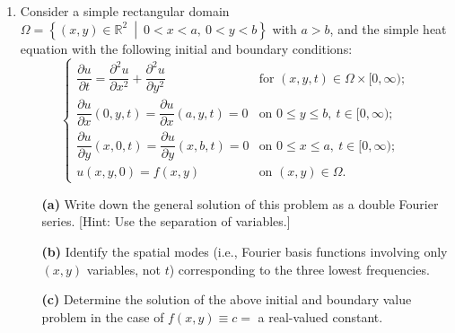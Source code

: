 \documentclass[10pt,letterpaper]{report}
\newcommand{\R}{\mathbb{R}}
\newcommand{\sett}[2]{\left\{{#1} \ \middle| \ {#2}\right\}}
\begin{document}
\begin{enumerate}
\item \begin{qbox}
Consider a simple rectangular domain $\Omega = \sett{(x, y) \in \R^2}{0 < x< a,\ 0 < y < b}$ with $a > b$, and the simple heat equation with the following initial and boundary conditions:
\[
\begin{cases}
\dfrac{\partial u}{\partial t} = \dfrac{\partial^2 u}{\partial x^2} + \dfrac{\partial^2 u}{\partial y^2} &\textrm{for } (x, y, t) \in \Omega \times [0, \infty);
\\
\dfrac{\partial u}{\partial x}(0, y, t) = \dfrac{\partial u}{\partial x}(a, y, t) = 0  &\textrm{on } 0 \leq y \leq b,\ t\in [0, \infty);
\\
\dfrac{\partial u}{\partial y}(x, 0, t) = \dfrac{\partial u}{\partial y}(x, b, t) = 0  &\textrm{on } 0 \leq x \leq a,\ t\in [0, \infty);
\\
u(x, y, 0) = f(x, y) &\textrm{on }(x, y) \in \Omega.
\end{cases}
\]
\begin{itemize}
    \item[\textbf{(a)}] Write down the general solution of this problem as a double Fourier series. [Hint: Use the separation of variables.]
    \item[\textbf{(b)}] Identify the spatial modes (i.e., Fourier basis functions involving only $(x, y)$ variables, not $t$) corresponding to the three lowest frequencies.
    \item[\textbf{(c)}] Determine the solution of the above initial and boundary value problem in the case of $f(x, y) \equiv c =$ a real-valued constant.
\end{itemize}
\end{qbox}


\end{enumerate}
\end{document}
